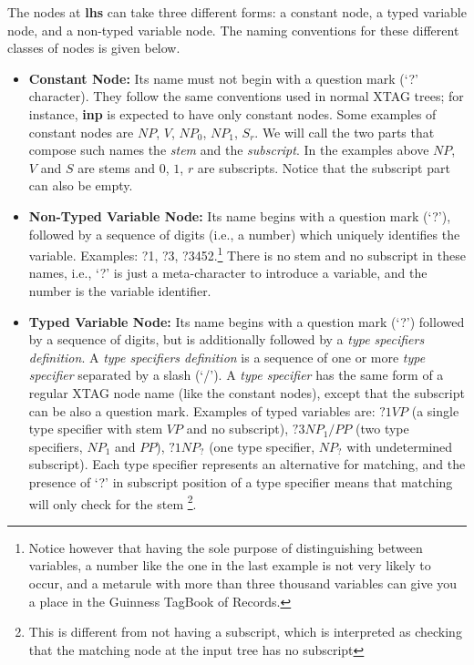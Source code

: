 The nodes at {\bf lhs} can take three 
different forms: a constant node, a typed variable node, and a non-typed 
variable node. The naming conventions for these different classes of nodes is 
given below.

\begin{itemize}

\item {\bf Constant Node:} Its name must not begin with a question mark
        (`?' character). They follow the same conventions used in normal
        XTAG trees; for instance, {\bf inp} is expected to have only constant
        nodes. Some examples of constant nodes are $NP$, $V$, $NP_0$, $NP_1$,
        $S_r$. We will call the two parts that compose such names
        the {\it stem} and the {\it subscript}.
        In the examples above  $NP$, $V$ and $S$ are stems and 
        $0$, $1$, $r$ are subscripts. Notice that the
        subscript part can also be empty.

\item {\bf Non-Typed Variable Node:} Its name begins with a question 
        mark (`?'), followed by a sequence of digits (i.e., a number) which
        uniquely identifies the variable. Examples: ?1, ?3,
        ?3452.\footnote{Notice however that having the sole purpose of
        distinguishing between variables, a number like the one in the last
        example is not very likely to occur, and a metarule with more than
        three thousand variables can give you a place in the Guinness TagBook
        of Records.} There is no stem and no subscript in these
        names, i.e., `?' is just a meta-character to introduce a variable, and
        the number is the variable identifier.

\item {\bf Typed Variable Node:} Its name begins with a question mark (`?')
        followed by a sequence of digits, but is additionally followed by a
        {\it type specifiers definition}. A {\it type specifiers definition} is
        a sequence of one or more {\it type specifier} separated by a slash
        (`/'). A {\it type specifier} has the same form of a regular XTAG node
        name (like the constant nodes), except that the subscript can be also a
        question mark. Examples of typed variables are: $?1VP$ (a single type
        specifier with stem $VP$ and no subscript), $?3NP_1/PP$ (two type
        specifiers, $NP_1$ and $PP$), $?1NP_?$ (one type specifier, $NP_?$ with
        undetermined subscript).  Each type specifier represents an alternative
        for matching, and the presence of `?' in subscript position of a type
        specifier means that matching will only check for the stem
        \footnote{This is different from not having a subscript, which is
       	interpreted as checking that the matching node at the input tree
        has no subscript}.
\end{itemize}

